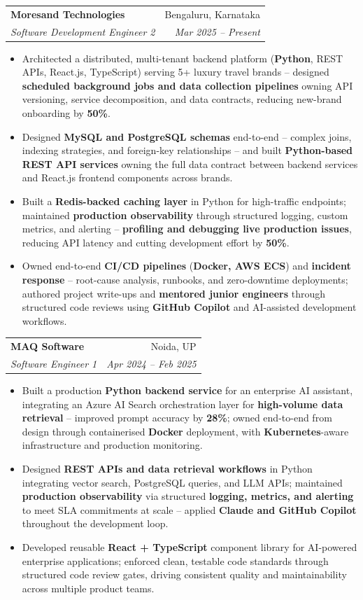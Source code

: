 \documentclass[a4paper,20pt]{article}
\makeatletter
\newcommand{\resumeSubheading}[4]{\vspace{-1pt}\item\begin{tabular*}{0.97\textwidth}{l@{\extracolsep{\fill}}r}\textbf{#1} & #2 \\\textit{#3} & \textit{#4} \\\end{tabular*}\vspace{-5pt}}
\newcommand{\resumeItemListStart}{\begin{itemize}}
\newcommand{\resumeItemListEnd}{\end{itemize}\vspace{-5pt}}
\makeatother
\begin{document}
    \resumeSubheading
      {Moresand Technologies}{Bengaluru, Karnataka}
      {Software Development Engineer 2}{Mar 2025 -- Present}
      \resumeItemListStart
        \item\small{Architected a distributed, multi-tenant backend platform (\textbf{Python}, REST APIs, React.js, TypeScript) serving 5+ luxury travel brands -- designed \textbf{scheduled background jobs and data collection pipelines} owning API versioning, service decomposition, and data contracts, reducing new-brand onboarding by \textbf{50\%}.}
        \item\small{Designed \textbf{MySQL and PostgreSQL schemas} end-to-end -- complex joins, indexing strategies, and foreign-key relationships -- and built \textbf{Python-based REST API services} owning the full data contract between backend services and React.js frontend components across brands.}
        \item\small{Built a \textbf{Redis-backed caching layer} in Python for high-traffic endpoints; maintained \textbf{production observability} through structured logging, custom metrics, and alerting -- \textbf{profiling and debugging live production issues}, reducing API latency and cutting development effort by \textbf{50\%}.}
        \item\small{Owned end-to-end \textbf{CI/CD pipelines} (\textbf{Docker, AWS ECS}) and \textbf{incident response} -- root-cause analysis, runbooks, and zero-downtime deployments; authored project write-ups and \textbf{mentored junior engineers} through structured code reviews using \textbf{GitHub Copilot} and AI-assisted development workflows.}
      \resumeItemListEnd

    \resumeSubheading
      {MAQ Software}{Noida, UP}
      {Software Engineer 1}{Apr 2024 -- Feb 2025}
      \resumeItemListStart
        \item\small{Built a production \textbf{Python backend service} for an enterprise AI assistant, integrating an Azure AI Search orchestration layer for \textbf{high-volume data retrieval} -- improved prompt accuracy by \textbf{28\%}; owned end-to-end from design through containerised \textbf{Docker} deployment, with \textbf{Kubernetes}-aware infrastructure and production monitoring.}
        \item\small{Designed \textbf{REST APIs and data retrieval workflows} in Python integrating vector search, PostgreSQL queries, and LLM APIs; maintained \textbf{production observability} via structured \textbf{logging, metrics, and alerting} to meet SLA commitments at scale -- applied \textbf{Claude and GitHub Copilot} throughout the development loop.}
        \item\small{Developed reusable \textbf{React + TypeScript} component library for AI-powered enterprise applications; enforced clean, testable code standards through structured code review gates, driving consistent quality and maintainability across multiple product teams.}
      \resumeItemListEnd
\end{document}
